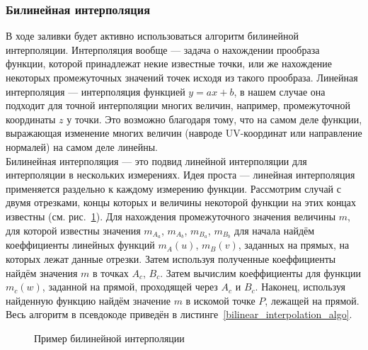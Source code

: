 \documentclass[a4paper,12pt]{report}
\numberwithin{equation}{section}
\begin{document}
\subsubsection{Билинейная интерполяция} \label{bilinear_interpolation_section}
В ходе заливки будет активно использоваться алгоритм билинейной интерполяции. \cite{wiki:bilinear} Интерполяция вообще --- задача о нахождении прообраза функции, которой принадлежат некие известные точки, или же нахождение некоторых промежуточных значений точек исходя из такого прообраза. Линейная интерполяция --- интерполяция функцией $y=ax+b$, в нашем случае она подходит для точной интерполяции многих величин, например, промежуточной координаты $z$ у точки. Это возможно благодаря тому, что на самом деле функции, выражающая изменение многих величин (навроде UV-координат или направление нормалей) на самом деле линейны. \\
Билинейная интерполяция --- это подвид линейной интерполяции для интерполяции в нескольких измерениях. Идея проста --- линейная интерполяция применяется раздельно к каждому измерению функции. Рассмотрим случай с двумя отрезками, концы которых и величины некоторой функции на этих концах известны (см. рис.~\ref{bilinear_interpolation_img}). Для нахождения промежуточного значения величины $m$, для которой известны значения $m_{A_a}$, $m_{A_b}$, $m_{B_a}$, $m_{B_b}$ для начала найдём коеффициенты линейных функций $m_A(u)$, $m_B(v)$, заданных на прямых, на которых лежат данные отрезки. Затем используя полученные коеффициенты найдём значения $m$ в точках $A_c$, $B_c$. Затем вычислим коеффициенты для функции $m_c(w)$, заданной на прямой, проходящей через $A_c$ и $B_c$. Наконец, используя найденную функцию найдём значение $m$ в искомой точке $P$, лежащей на прямой. Весь алгоритм в псевдокоде приведён в листинге~\ref{bilinear_interpolation_algo}.

\begin{figure}[!h]
\centering
{}
\caption{Пример билинейной интерполяции}
\label{bilinear_interpolation_img}
\end{figure}
\end{document}
